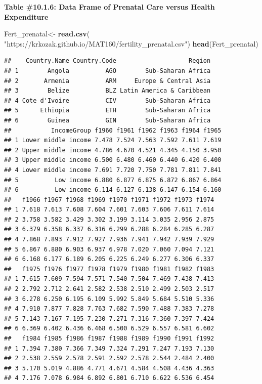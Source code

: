 \documentclass[
]{book}
\newenvironment{Shaded}{\begin{snugshade}}{\end{snugshade}}
\newcommand{\KeywordTok}[1]{\textcolor[rgb]{0.13,0.29,0.53}{\textbf{#1}}}
\newcommand{\NormalTok}[1]{#1}
\newcommand{\StringTok}[1]{\textcolor[rgb]{0.31,0.60,0.02}{#1}}
\begin{document}
\textbf{Table \#10.1.6: Data Frame of Prenatal Care versus Health Expenditure}

\begin{Shaded}
\begin{Highlighting}[]
\NormalTok{Fert_prenatal<-}\StringTok{ }\KeywordTok{read.csv}\NormalTok{(}
  \StringTok{"https://krkozak.github.io/MAT160/fertility_prenatal.csv"}\NormalTok{)}
\KeywordTok{head}\NormalTok{(Fert_prenatal)}
\end{Highlighting}
\end{Shaded}

\begin{verbatim}
##    Country.Name Country.Code                    Region
## 1        Angola          AGO        Sub-Saharan Africa
## 2       Armenia          ARM     Europe & Central Asia
## 3        Belize          BLZ Latin America & Caribbean
## 4 Cote d'Ivoire          CIV        Sub-Saharan Africa
## 5      Ethiopia          ETH        Sub-Saharan Africa
## 6        Guinea          GIN        Sub-Saharan Africa
##           IncomeGroup f1960 f1961 f1962 f1963 f1964 f1965
## 1 Lower middle income 7.478 7.524 7.563 7.592 7.611 7.619
## 2 Upper middle income 4.786 4.670 4.521 4.345 4.150 3.950
## 3 Upper middle income 6.500 6.480 6.460 6.440 6.420 6.400
## 4 Lower middle income 7.691 7.720 7.750 7.781 7.811 7.841
## 5          Low income 6.880 6.877 6.875 6.872 6.867 6.864
## 6          Low income 6.114 6.127 6.138 6.147 6.154 6.160
##   f1966 f1967 f1968 f1969 f1970 f1971 f1972 f1973 f1974
## 1 7.618 7.613 7.608 7.604 7.601 7.603 7.606 7.611 7.614
## 2 3.758 3.582 3.429 3.302 3.199 3.114 3.035 2.956 2.875
## 3 6.379 6.358 6.337 6.316 6.299 6.288 6.284 6.285 6.287
## 4 7.868 7.893 7.912 7.927 7.936 7.941 7.942 7.939 7.929
## 5 6.867 6.880 6.903 6.937 6.978 7.020 7.060 7.094 7.121
## 6 6.168 6.177 6.189 6.205 6.225 6.249 6.277 6.306 6.337
##   f1975 f1976 f1977 f1978 f1979 f1980 f1981 f1982 f1983
## 1 7.615 7.609 7.594 7.571 7.540 7.504 7.469 7.438 7.413
## 2 2.792 2.712 2.641 2.582 2.538 2.510 2.499 2.503 2.517
## 3 6.278 6.250 6.195 6.109 5.992 5.849 5.684 5.510 5.336
## 4 7.910 7.877 7.828 7.763 7.682 7.590 7.488 7.383 7.278
## 5 7.143 7.167 7.195 7.230 7.271 7.316 7.360 7.397 7.424
## 6 6.369 6.402 6.436 6.468 6.500 6.529 6.557 6.581 6.602
##   f1984 f1985 f1986 f1987 f1988 f1989 f1990 f1991 f1992
## 1 7.394 7.380 7.366 7.349 7.324 7.291 7.247 7.193 7.130
## 2 2.538 2.559 2.578 2.591 2.592 2.578 2.544 2.484 2.400
## 3 5.170 5.019 4.886 4.771 4.671 4.584 4.508 4.436 4.363
## 4 7.176 7.078 6.984 6.892 6.801 6.710 6.622 6.536 6.454

\end{verbatim}
\end{document}
